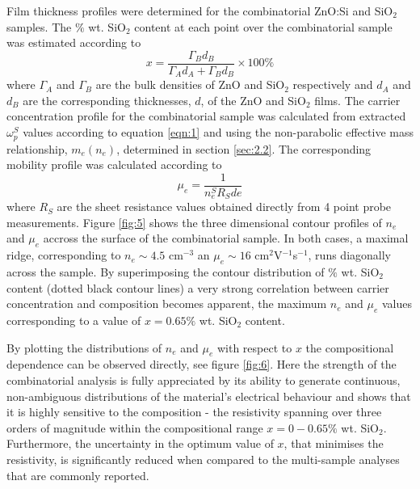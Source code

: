 \documentclass[preprint]{elsarticle}
\begin{document}
Film thickness profiles were determined for the combinatorial ZnO:Si and SiO$_{2}$ samples. The $\%$ wt. SiO$_{2}$ content at each point over the combinatorial sample was estimated according to
\begin{equation}
\label{eqn:8}
x = \frac{\Gamma_{B}d_{B}}{\Gamma_Ad_A+\Gamma_{B}d_{B}}\times100\%
\end{equation}
where $\Gamma_A$ and $\Gamma_B$ are the bulk densities of ZnO and SiO$_{2}$ respectively and $d_A$ and $d_B$ are the corresponding thicknesses, $d$, of the ZnO and SiO$_{2}$ films. The carrier concentration profile for the combinatorial sample was calculated from extracted $\omega_p^S$ values according to equation \ref{eqn:1} and using the non-parabolic effective mass relationship, $m_e(n_e)$, determined in section \ref{sec:2.2}. The corresponding mobility profile was calculated according to
\begin{equation}
\label{eqn:9}
\mu_e=\frac{1}{n_e^SR_Sde}
\end{equation}
where $R_S$ are the sheet resistance values obtained directly from 4 point probe measurements. Figure \ref{fig:5} shows the three dimensional contour profiles of $n_e$ and $\mu_e$ accross the surface of the combinatorial sample. In both cases, a maximal ridge, corresponding to $n_e\sim 4.5$ cm$^{-3}$ an $\mu_e \sim 16$ cm$^2$V$^{-1}$s$^{-1}$, runs diagonally across the sample. By superimposing the contour distribution of $\%$ wt. SiO$_{2}$ content (dotted black contour lines) a very strong correlation between carrier concentration and composition becomes apparent, the maximum $n_e$ and $\mu_e$ values corresponding to a value of $x=0.65\%$ wt. SiO$_{2}$ content.

By plotting the distributions of $n_e$ and $\mu_e$ with respect to $x$ the compositional dependence can be observed directly, see figure \ref{fig:6}. Here the strength of the combinatorial analysis is fully appreciated by its ability to generate continuous, non-ambiguous distributions of the material's electrical behaviour and shows that it is highly sensitive to the composition - the resistivity spanning over three orders of magnitude within the compositional range $x = 0 - 0.65\%$ wt. SiO$_{2}$. Furthermore, the uncertainty in the optimum value of $x$, that minimises the resistivity, is significantly reduced when compared to the multi-sample analyses that are commonly reported. 
\end{document}
